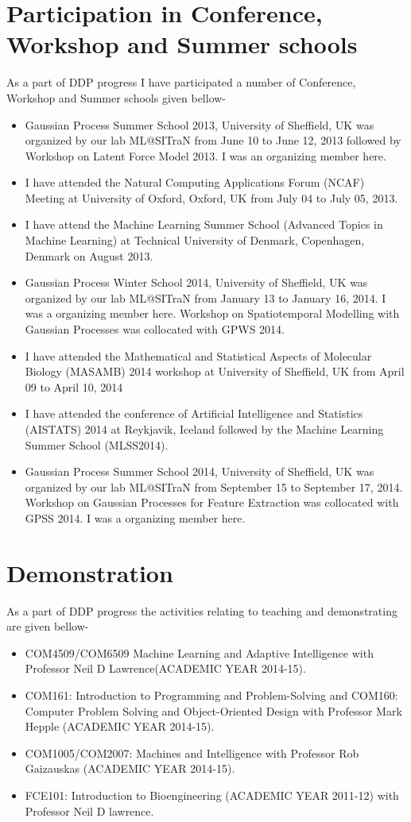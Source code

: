 \section{Participation in Conference, Workshop and Summer schools}

As a part of DDP progress I have participated a number of Conference, Workshop and Summer schools given bellow-
\begin{itemize}
\item Gaussian Process Summer School 2013, University of Sheffield, UK was organized by our lab ML@SITraN from June 10 to June 12, 2013 followed by Workshop on Latent Force Model 2013. I was an organizing member here.
\item I have attended the Natural Computing Applications Forum (NCAF) Meeting at University of Oxford, Oxford, UK from July 04 to July 05, 2013.
\item I have attend the Machine Learning Summer School (Advanced Topics in Machine Learning) at Technical University of Denmark, Copenhagen, Denmark on August 2013.
\item Gaussian Process Winter School 2014, University of Sheffield, UK was organized by our lab ML@SITraN from January 13 to January 16, 2014. I was a organizing member here. Workshop on Spatiotemporal Modelling with Gaussian Processes was collocated with GPWS 2014.
\item I have attended the Mathematical and Statistical Aspects of Molecular Biology (MASAMB) 2014 workshop at University of Sheffield, UK from April 09 to April 10, 2014
\item I have attended the conference of Artificial Intelligence and Statistics (AISTATS) 2014 at Reykjavik, Iceland followed by the Machine Learning Summer School (MLSS2014).
\item Gaussian Process Summer School 2014, University of Sheffield, UK was organized by our lab ML@SITraN from September 15 to September 17, 2014. Workshop on Gaussian Processes for Feature Extraction was collocated with GPSS 2014. I was a organizing member here.
\end{itemize}

\section{Demonstration}
As a part of DDP progress the activities relating to teaching and demonstrating are given bellow-
\begin{itemize}
\item COM4509/COM6509 Machine Learning and Adaptive Intelligence with Professor Neil D Lawrence(ACADEMIC YEAR 2014-15). 
\item COM161: Introduction to Programming and Problem-Solving and COM160: Computer Problem Solving and Object-Oriented Design with Professor Mark Hepple (ACADEMIC YEAR 2014-15).
\item COM1005/COM2007: Machines and Intelligence with Professor Rob Gaizauskas (ACADEMIC YEAR 2014-15).
\item FCE101: Introduction to Bioengineering (ACADEMIC YEAR 2011-12) with Professor Neil D lawrence.
\end{itemize}

